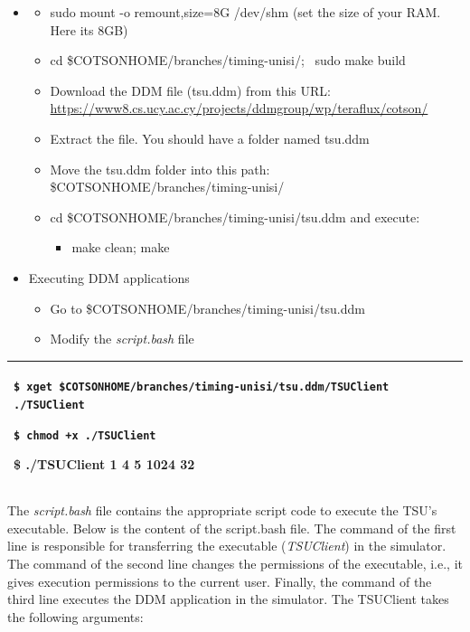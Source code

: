 \documentclass[a4paper]{article}
\begin{document}
\begin{itemize}
\item \begin{itemize}
\item {
sudo mount -o remount,size=8G /dev/shm (set the size of your RAM. Here
it{\textquotesingle}s 8GB)}
\item {
cd \$COTSONHOME/branches/timing-unisi/; \ sudo make build}
\item {
Download the DDM file (tsu.ddm) from this URL:
\url{https://www8.cs.ucy.ac.cy/projects/ddmgroup/wp/teraflux/cotson/}}
\item {
Extract the file. You should have a folder named tsu.ddm}
\item {
Move the tsu.ddm folder into this path:
\$COTSONHOME/branches/timing-unisi/}
\item {
cd \$COTSONHOME/branches/timing-unisi/tsu.ddm and execute:}

\begin{itemize}
\item {
make clean; make}
\end{itemize}
\end{itemize}
\end{itemize}

\bigskip

\begin{itemize}
\item {
Executing DDM applications}

\begin{itemize}
\item {
Go to \$COTSONHOME/branches/timing-unisi/tsu.ddm}
\item {
Modify the \textit{script.bash} file}
\end{itemize}
\end{itemize}
\begin{flushleft}
\tablehead{}
\begin{supertabular}{|m{6.29346in}|}
\hline
{ \texttt{\$ xget
}\texttt{\$COTSONHOME/}\texttt{branches/timing-unisi/tsu.ddm/TSUClient
./TSUClient}}

{ \texttt{\$ chmod +x ./TSUClient}}

\ttfamily \$ ./TSUClient 1 4 5 1024 32\\\hline
\end{supertabular}
\end{flushleft}
{
The \textit{script.bash} file contains the appropriate script code to
execute the TSU{\textquoteright}s executable. Below is the content of
the script.bash file. The command of the first line is responsible for
transferring the executable (\textit{TSUClient}) in the simulator. The
command of the second line changes the permissions of the executable,
i.e., it gives execution permissions to the current user. Finally, the
command of the third line executes the DDM application in the
simulator. The TSUClient takes the following arguments:}
\end{document}

